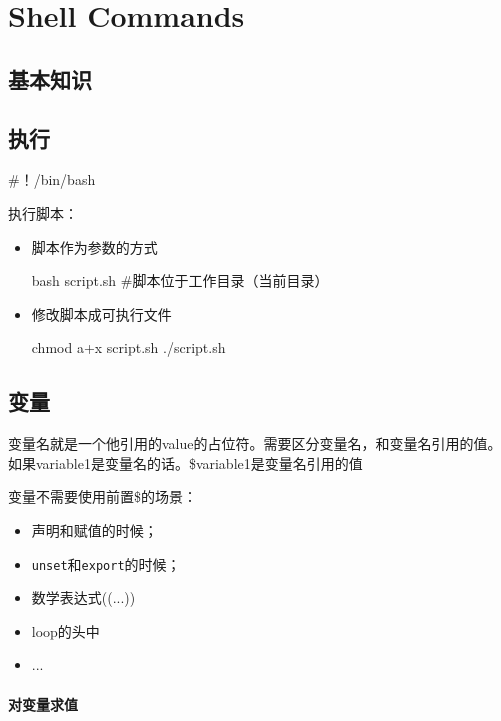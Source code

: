 \chapter{Shell Commands}

\section{基本知识}

\section{执行}

\begin{Command-Line}[开头告诉shell使用什么bash]
#！/bin/bash
\end{Command-Line}


执行脚本：

\begin{itemize}
\item 脚本作为参数的方式
\begin{Command-Line}
bash script.sh   #脚本位于工作目录（当前目录）
\end{Command-Line}

\item 修改脚本成可执行文件

\begin{Command-Line}[内核会读取首行来确定执行的bash]
chmod a+x script.sh
./script.sh
\end{Command-Line}

\end{itemize}

\section{变量}

变量名就是一个他引用的value的占位符。需要区分变量名，和变量名引用的值。如果variable1是变量名的话。\$variable1是变量名引用的值

变量不需要使用前置\$的场景：
\begin{itemize}
\item 声明和赋值的时候；
\item \lstinline$unset$和\lstinline$export$的时候；
\item 数学表达式((...))
\item loop的头中
\item ...
\end{itemize}


\subsubsection{对变量求值}



